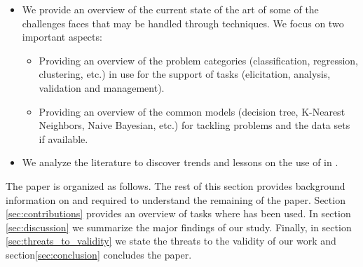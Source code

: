 \begin{itemize}
    \item We provide an overview of the current state of the art of some of the
    challenges \RE faces that may be handled through \ML techniques. We focus on
    two important aspects:
    \begin{itemize}
        \item Providing an overview of the \ML problem categories
        (classification, regression, clustering, etc.) in use for the support of
        \RE tasks (elicitation, analysis, validation and management).
        \item Providing an overview of the common \ML models (decision tree,
        K-Nearest Neighbors, Naive Bayesian, etc.) for tackling \RE problems and
        the data sets if available.
    \end{itemize}
    \item We analyze the literature to discover trends and lessons on the use of \ML in \RE.
\end{itemize}
The paper is organized as follows. The rest of this section provides
background information on \ML and \RE required to understand the remaining of
the paper. Section \ref{sec:contributions} provides an overview of \RE tasks
where \ML has been used. In section \ref{sec:discussion} we summarize the major
findings of our study. Finally, in section \ref{sec:threats_to_validity} we
state the threats to the validity of our work and section\ref{sec:conclusion}
concludes the paper.



